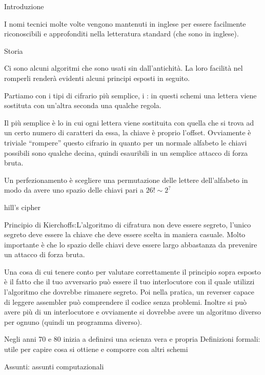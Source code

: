 

\capitolo Introduzione

I nomi tecnici molte volte vengono mantenuti in inglese per essere facilmente
riconoscibili e approfonditi nella letteratura standard (che sono in inglese).

\sezione Storia

Ci sono alcuni algoritmi che sono usati sin dall'antichit\`a. La loro facilit\`a nel
romperli render\`a evidenti alcuni principi esposti in seguito.

Partiamo con i tipi di cifrario pi\`u semplice, i :
in questi schemi una lettera viene sostituta con un'altra seconda una qualche regola.

Il pi\`u semplice \`e lo  in cui ogni lettera viene sostituita
con quella che si trova ad un certo numero di caratteri da essa, la chiave \`e proprio
l'offset. Ovviamente \`e triviale ``rompere'' questo cifrario in quanto per un normale
alfabeto le chiavi possibili sono qualche decina, quindi esauribili in un semplice
attacco di forza bruta.

Un perfezionamento \`e scegliere una permutazione delle lettere dell'alfabeto in modo
da avere uno spazio delle chiavi pari a $26!\sim 2^?$

\todo hill's cipher

\ddefinizione Principio di Kierchoffs:L'algoritmo di cifratura non deve essere segreto,
l'unico segreto deve essere la chiave che deve essere scelta in maniera casuale. Molto
importante \`e che lo spazio delle chiavi deve essere largo abbastanza da prevenire
un attacco di forza bruta.

Una cosa di cui tenere conto per valutare correttamente il principio sopra esposto \`e
il fatto che il tuo avversario pu\`o essere il tuo interlocutore con il quale utilizzi
l'algoritmo che dovrebbe rimanere segreto. Poi nella pratica, un reverser capace di leggere
assembler pu\`o comprendere il codice senza problemi. Inoltre si pu\`o avere pi\`u di un interlocutore e ovviamente
si dovrebbe avere un algoritmo diverso per ognuno (quindi un programma diverso).

Negli anni 70 e 80 inizia a definirsi una scienza vera e propria
\medskip
\voce Definizioni formali: utile per capire cosa si ottiene e comporre con altri schemi

\voce Assunti: assunti computazionali

